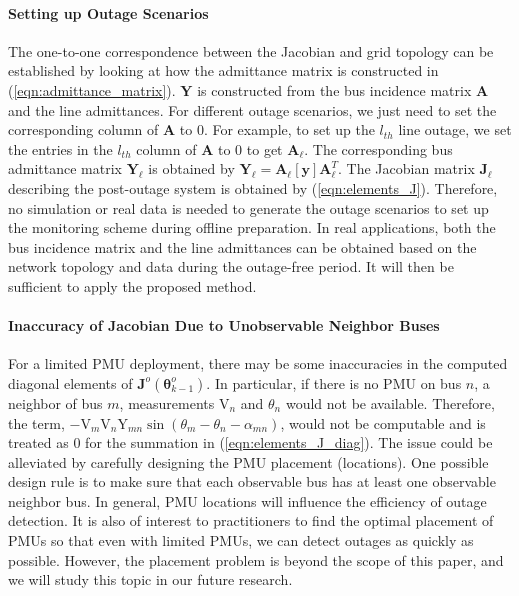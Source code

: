 \paragraph{Setting up Outage Scenarios}
The one-to-one correspondence between the Jacobian and grid topology can be established by looking at how the admittance matrix is constructed in (\ref{eqn:admittance_matrix}). $\boldsymbol{Y}$ is constructed from the bus incidence matrix $\mathbf{A}$ and the line admittances. For different outage scenarios, we just need to set the corresponding column of $\mathbf A$ to 0. For example, to set up the $l_{th}$ line outage, we set the entries in the $l_{th}$ column of $\mathbf{A}$ to 0 to get $\mathbf{A}_\ell$. The corresponding bus admittance matrix $\boldsymbol{Y}_{\ell}$ is obtained by $\boldsymbol{Y}_{\ell} = \mathbf{A}_\ell \mathbf{[y]} \mathbf{A}_\ell^{T}$. The Jacobian matrix $\mathbf{J}_{\ell}$ describing the post-outage system is obtained by (\ref{eqn:elements_J}). Therefore, no simulation or real data is needed to generate the outage scenarios to set up the monitoring scheme during offline preparation. In real applications, both the bus incidence matrix and the line admittances can be obtained based on the network topology and data during the outage-free period. It will then be sufficient to apply the proposed method.

\paragraph{Inaccuracy of Jacobian Due to Unobservable Neighbor Buses}
For a limited PMU deployment, there may be some inaccuracies in the computed diagonal elements of $\mathbf{J}^o(\boldsymbol{\theta}^o_{k-1})$. In particular, if there is no PMU on bus $n$, a neighbor of bus $m$, measurements $\text{V}_{n}$ and $\theta_{n}$ would not be available. Therefore, the term, $-\text{V}_{m} \text{V}_{n} \text{Y}_{m n} \sin \left(\theta_{m}-\theta_{n}-\alpha_{m n}\right)$, would not be computable and is treated as 0 for the summation in (\ref{eqn:elements_J_diag}). The issue could be alleviated by carefully designing the PMU placement (locations). One possible design rule is to make sure that each observable bus has at least one observable neighbor bus. In general, PMU locations will influence the efficiency of outage detection. It is also of interest to practitioners to find the optimal placement of PMUs so that even with limited PMUs, we can detect outages as quickly as possible. However, the placement problem is beyond the scope of this paper, and we will study this topic in our future research. 

